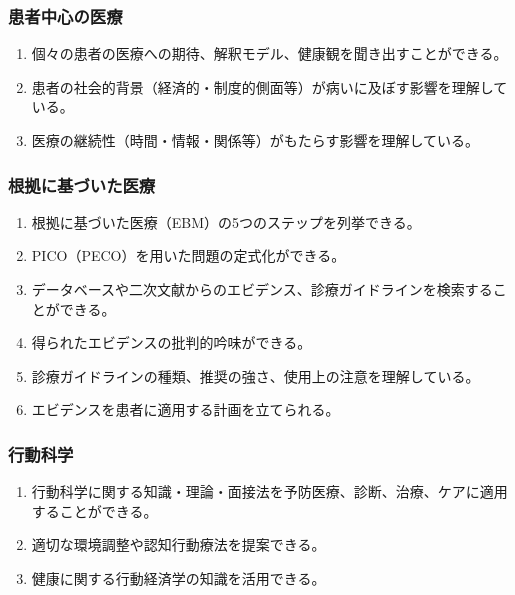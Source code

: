 \hypertarget{ux60a3ux8005ux4e2dux5fc3ux306eux533bux7642}{%
\subsubsection{患者中心の医療}\label{ux60a3ux8005ux4e2dux5fc3ux306eux533bux7642}}

\begin{enumerate}
\def\labelenumi{\arabic{enumi}.}
\tightlist
\item
  個々の患者の医療への期待、解釈モデル、健康観を聞き出すことができる。
\item
  患者の社会的背景（経済的・制度的側面等）が病いに及ぼす影響を理解している。
\item
  医療の継続性（時間・情報・関係等）がもたらす影響を理解している。
\end{enumerate}

\hypertarget{ux6839ux62e0ux306bux57faux3065ux3044ux305fux533bux7642}{%
\subsubsection{根拠に基づいた医療}\label{ux6839ux62e0ux306bux57faux3065ux3044ux305fux533bux7642}}

\begin{enumerate}
\def\labelenumi{\arabic{enumi}.}
\tightlist
\item
  根拠に基づいた医療（EBM）の5つのステップを列挙できる。
\item
  PICO（PECO）を用いた問題の定式化ができる。
\item
  データベースや二次文献からのエビデンス、診療ガイドラインを検索することができる。
\item
  得られたエビデンスの批判的吟味ができる。
\item
  診療ガイドラインの種類、推奨の強さ、使用上の注意を理解している。
\item
  エビデンスを患者に適用する計画を立てられる。
\end{enumerate}

\hypertarget{ux884cux52d5ux79d1ux5b66}{%
\subsubsection{行動科学}\label{ux884cux52d5ux79d1ux5b66}}

\begin{enumerate}
\def\labelenumi{\arabic{enumi}.}
\tightlist
\item
  行動科学に関する知識・理論・面接法を予防医療、診断、治療、ケアに適用することができる。
\item
  適切な環境調整や認知行動療法を提案できる。
\item
  健康に関する行動経済学の知識を活用できる。
\end{enumerate}

